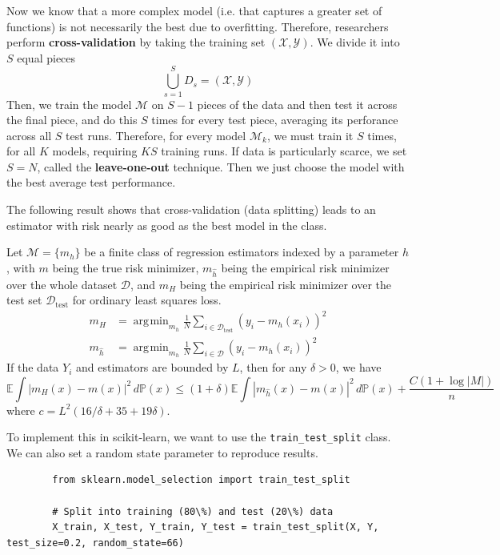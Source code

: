 \documentclass{article}
\DeclareMathOperator*{\argmin}{\arg\!\min}
\begin{document}
    Now we know that a more complex model (i.e. that captures a greater set of functions) is not necessarily the best due to overfitting. Therefore, researchers perform \textbf{cross-validation} by taking the training set $(\mathcal{X}, \mathcal{Y})$. We divide it into $S$ equal pieces 
    \begin{equation}
      \bigcup_{s=1}^S D_s = (\mathcal{X}, \mathcal{Y})
    \end{equation}
    Then, we train the model $\mathcal{M}$ on $S-1$ pieces of the data and then test it across the final piece, and do this $S$ times for every test piece, averaging its perforance across all $S$ test runs. Therefore, for every model $\mathcal{M}_k$, we must train it $S$ times, for all $K$ models, requiring $KS$ training runs. If data is particularly scarce, we set $S = N$, called the \textbf{leave-one-out} technique. Then we just choose the model with the best average test performance. 

    The following result shows that cross-validation (data splitting) leads to an estimator with risk nearly as good as the best model in the class. 


    \begin{theorem}
      Let $\mathcal{M} = \{m_h\}$ be a finite class of regression estimators indexed by a parameter $h$, with $m$ being the true risk minimizer, $m_{\hat{h}}$ being the empirical risk minimizer over the whole dataset $\mathcal{D}$, and $m_{H}$ being the empirical risk minimizer over the test set $\mathcal{D}_{\mathrm{test}}$ for ordinary least squares loss. 
      \begin{align}
        m_H & = \argmin_{m_h} \frac{1}{N} \sum_{i \in \mathcal{D}_{\mathrm{test}}} (y_i - m_h(x_i))^2 \\ 
        m_{\hat{h}} & = \argmin_{m_h} \frac{1}{N} \sum_{i \in \mathcal{D}} (y_i - m_h(x_i))^2 
      \end{align}
      If the data $Y_i$ and estimators are bounded by $L$, then for any $\delta > 0$, we have 
      \begin{equation}
        \mathbb{E} \int |m_H (x) - m(x)|^2 \,d\mathbb{P}(x) \leq (1 + \delta) \mathbb{E} \int |m_{\hat{h}} (x) - m(x) |^2 \,d \mathbb{P}(x) + \frac{C (1 + \log{|M|})}{n}
      \end{equation}
      where $c = L^2 (16/\delta + 35 + 19\delta)$. 
    \end{theorem}

    \begin{code}
      To implement this in scikit-learn, we want to use the \texttt{train\_test\_split} class. We can also set a random state parameter to reproduce results. 
      \begin{lstlisting}
        from sklearn.model_selection import train_test_split 

        # Split into training (80\%) and test (20\%) data 
        X_train, X_test, Y_train, Y_test = train_test_split(X, Y, test_size=0.2, random_state=66)
      \end{lstlisting}
    \end{code}
\end{document}
